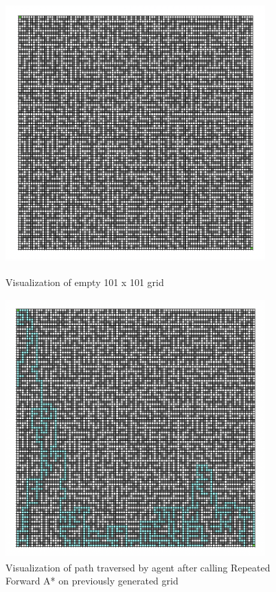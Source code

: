 \documentclass[12pt, letterpaper]{article}
\begin{document}
\begin{figure}
\centering
\includegraphics[width=10cm, height=10cm]{empty}
\caption[margin=0.1cm]{Visualization of empty 101 x 101 grid}
\includegraphics[width=10cm, height=10cm]{forward}
\caption{Visualization of path traversed by agent after calling Repeated Forward A* on previously generated grid}

\end{figure}
\pagebreak
\end{document}
